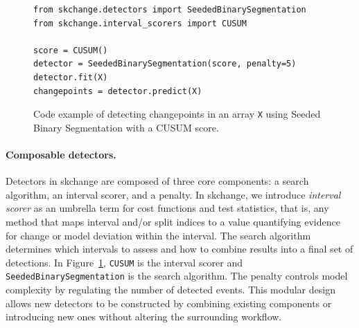 \documentclass[twoside,11pt]{article}
\begin{document}
\begin{figure}[t]
\centering
\begin{verbatim}
from skchange.detectors import SeededBinarySegmentation
from skchange.interval_scorers import CUSUM

score = CUSUM()
detector = SeededBinarySegmentation(score, penalty=5)
detector.fit(X)
changepoints = detector.predict(X)
\end{verbatim}
\caption{
Code example of detecting changepoints in an array \texttt{X} using Seeded Binary Segmentation with a CUSUM score.
}
\label{fig:code_example}
\end{figure}


\paragraph{Composable detectors.}
Detectors in skchange are composed of three core components: a search algorithm, an interval scorer, and a penalty.
In skchange, we introduce \emph{interval scorer} as an umbrella term for cost functions and test statistics, that is, any method that maps interval and/or split indices to a value quantifying evidence for change or model deviation within the interval.
The search algorithm determines which intervals to assess and how to combine results into a final set of detections.
In Figure~\ref{fig:code_example}, \texttt{CUSUM} is the interval scorer and \texttt{SeededBinarySegmentation} is the search algorithm.
The penalty controls model complexity by regulating the number of detected events.
This modular design allows new detectors to be constructed by combining existing components or introducing new ones without altering the surrounding workflow.
\end{document}

